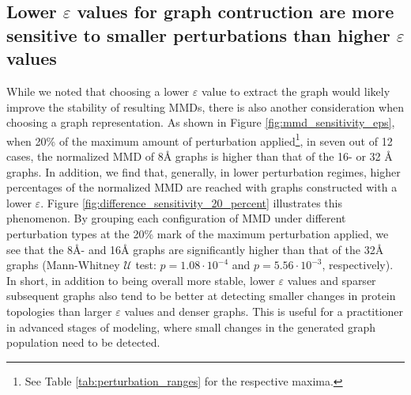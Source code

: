 \subsection{Lower $\varepsilon$ values for graph contruction are more
sensitive to smaller perturbations than higher $\varepsilon$ values}\label{sec:sensitivity}
While we noted that choosing a lower $\varepsilon$ value
to extract the graph would likely improve the stability of resulting MMDs, there
is also another consideration when choosing a graph representation. As shown in
Figure \ref{fig:mmd_sensitivity_eps}, when 20\% of the maximum amount of
perturbation applied\footnote{See Table \ref{tab:perturbation_ranges} for the
respective maxima.}, in seven out of 12 cases, the normalized MMD of
8\si{\angstrom} graphs is higher than that of the 16- or 32 \si{\angstrom} graphs. In
addition, we find that, generally, in lower perturbation regimes, higher
percentages of the normalized MMD are reached with graphs constructed with a
lower $\varepsilon$. Figure \ref{fig:difference_sensitivity_20_percent}
illustrates this phenomenon. By grouping each configuration of MMD under
different perturbation types at the 20\% mark of the maximum perturbation
applied, we see that the 8\si{\angstrom}- and 16\si{\angstrom} graphs are
significantly higher than that of the 32\si{\angstrom} graphs (Mann-Whitney
$\mathcal{U}$ test: $p=1.08\cdot 10^{-4}$ and $p=5.56\cdot 10^{-3}$,
respectively). In short, in addition to being overall more stable, lower
$\varepsilon$ values and sparser subsequent graphs also tend to be better at
detecting smaller changes in protein topologies than larger $\varepsilon$ values
and denser graphs. This is useful for a practitioner in advanced stages of
modeling, where small changes in the generated graph population need to be
detected.


